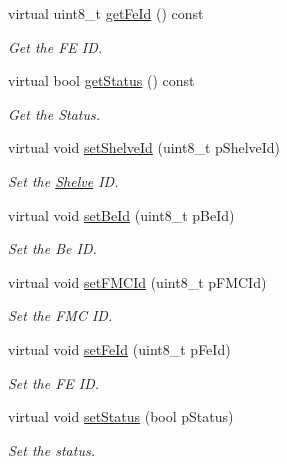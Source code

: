 \begin{CompactItemize}
virtual uint8\_\-t \hyperlink{class_ph2___hw_description_1_1_front_end_description_e929f2f3d2d8f785506a51e0d9cf44dd}{get\-Fe\-Id} () const 
\begin{CompactList}\small\item\em Get the FE ID. \item\end{CompactList}\item 
virtual bool \hyperlink{class_ph2___hw_description_1_1_front_end_description_867b5c7ff86669819f168cea49539386}{get\-Status} () const 
\begin{CompactList}\small\item\em Get the Status. \item\end{CompactList}\item 
virtual void \hyperlink{class_ph2___hw_description_1_1_front_end_description_b876244bc12be6e5b622f57eccd61c0e}{set\-Shelve\-Id} (uint8\_\-t p\-Shelve\-Id)
\begin{CompactList}\small\item\em Set the \hyperlink{class_ph2___hw_description_1_1_shelve}{Shelve} ID. \item\end{CompactList}\item 
virtual void \hyperlink{class_ph2___hw_description_1_1_front_end_description_f123e6401d5e89f4bf6c52cc23911965}{set\-Be\-Id} (uint8\_\-t p\-Be\-Id)
\begin{CompactList}\small\item\em Set the Be ID. \item\end{CompactList}\item 
virtual void \hyperlink{class_ph2___hw_description_1_1_front_end_description_de9e6abc89ff5c5477584cc58b7c04b2}{set\-FMCId} (uint8\_\-t p\-FMCId)
\begin{CompactList}\small\item\em Set the FMC ID. \item\end{CompactList}\item 
virtual void \hyperlink{class_ph2___hw_description_1_1_front_end_description_99950602e14a271cf1e2fc71be4d9e91}{set\-Fe\-Id} (uint8\_\-t p\-Fe\-Id)
\begin{CompactList}\small\item\em Set the FE ID. \item\end{CompactList}\item 
virtual void \hyperlink{class_ph2___hw_description_1_1_front_end_description_cd0db6c28f72c80079b22ed5da535a40}{set\-Status} (bool p\-Status)
\begin{CompactList}\small\item\em Set the status. \item\end{CompactList}\end{CompactItemize}
